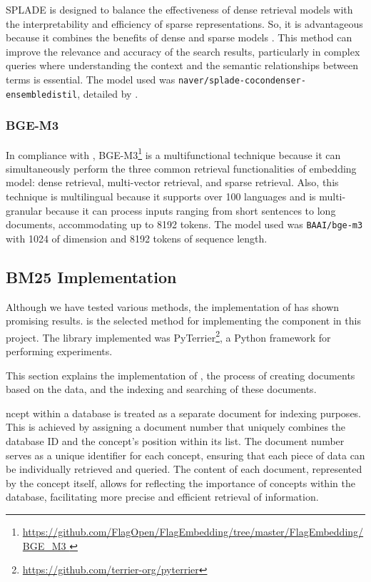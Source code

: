 SPLADE is designed to balance the effectiveness of dense retrieval models with the interpretability and efficiency of sparse representations. So, it is advantageous  because it combines the benefits of dense and sparse models \cite{formal_splade_2021}. This method can improve the relevance and accuracy of the search results, particularly in complex queries where understanding the context and the semantic relationships between terms is essential. The model used was \texttt{naver/splade-cocondenser-ensembledistil}, detailed by \citet{formal_distillation_2022}.



\subsubsection{BGE-M3} 

In compliance with \citet{chen_bge_2024}, BGE-M3\footnote{\url{https://github.com/FlagOpen/FlagEmbedding/tree/master/FlagEmbedding/BGE_M3 }} is a multifunctional technique because it can simultaneously perform  the three common retrieval functionalities of embedding model: dense retrieval, multi-vector retrieval, and sparse retrieval. Also, this technique is multilingual because it supports over 100 languages and is multi-granular because it can process inputs ranging from short sentences to long documents, accommodating up to 8192 tokens. The model used was \texttt{BAAI/bge-m3} with 1024 of dimension and 8192 tokens of sequence length.




\subsection{BM25 Implementation}
\label{bm25implementation}

Although we have tested various methods, the implementation of {\bm} has shown promising results. {\bm} is the selected method for implementing the {\ir} component in this project. The library implemented was PyTerrier\footnote{\url{https://github.com/terrier-org/pyterrier}}, a Python framework for performing {\ir} experiments.

This section explains the implementation of {\bm}, the process of creating documents based on the {\ehden} data, and the indexing and searching of these documents.


ncept within a database is treated as a separate document for indexing purposes. This is achieved by assigning a document number that uniquely combines the database ID and the concept's position within its list. The document number serves as a unique identifier for each concept, ensuring that each piece of data can be individually retrieved and queried. The content of each document, represented by the concept itself, allows for reflecting the importance of concepts within the database, facilitating more precise and efficient retrieval of information.


